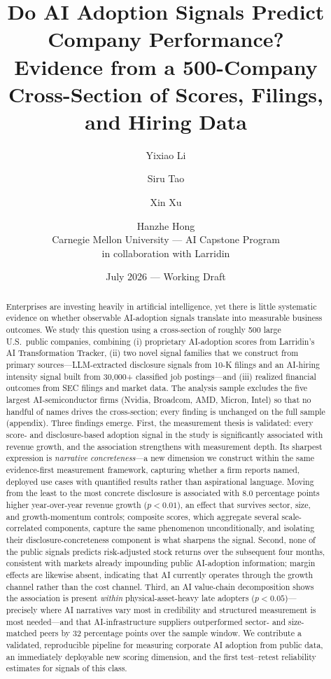 \documentclass[11pt]{article}
\title{\textbf{Do AI Adoption Signals Predict Company Performance?}\\
\large Evidence from a 500-Company Cross-Section of Scores, Filings, and Hiring Data}
\author{
Yixiao Li \and Siru Tao \and Xin Xu \and Hanzhe Hong\\[4pt]
\normalsize Carnegie Mellon University --- AI Capstone Program\\
\normalsize in collaboration with Larridin
}
\date{July 2026 --- Working Draft}
\begin{document}
\maketitle

\begin{abstract}
\noindent
Enterprises are investing heavily in artificial intelligence, yet there is little
systematic evidence on whether observable AI-adoption signals translate into
measurable business outcomes. We study this question using a cross-section of
roughly 500 large U.S.\ public companies, combining (i) proprietary AI-adoption
scores from Larridin's AI Transformation Tracker, (ii) two novel signal families
that we construct from primary sources---LLM-extracted disclosure signals from
10-K filings and an AI-hiring intensity signal built from 30{,}000+ classified
job postings---and (iii) realized financial outcomes from SEC filings and market
data. The analysis sample excludes the five largest AI-semiconductor firms
(Nvidia, Broadcom, AMD, Micron, Intel) so that no handful of names drives the
cross-section; every finding is unchanged on the full sample (appendix).
Three findings emerge. First, the measurement thesis is validated: every score- and
disclosure-based adoption signal in the study is significantly associated with
revenue growth, and the association strengthens with measurement depth. Its
sharpest expression is \emph{narrative concreteness}---a new dimension we
construct within the same evidence-first measurement framework, capturing
whether a firm reports named, deployed use cases with quantified results
rather than aspirational language. Moving from the least to the most concrete
disclosure is associated with 8.0 percentage points higher year-over-year
revenue growth ($p<0.01$), an effect that survives sector, size, and
growth-momentum controls; composite scores, which aggregate several
scale-correlated components, capture the same phenomenon unconditionally,
and isolating their disclosure-concreteness component is what sharpens the
signal. Second, none of the public signals predicts risk-adjusted stock
returns over the subsequent four months, consistent with markets already
impounding public AI-adoption information; margin effects are likewise absent,
indicating that AI currently operates through the growth channel rather than
the cost channel. Third, an AI value-chain decomposition shows the association
is present \emph{within} physical-asset-heavy late adopters
($p<0.05$)---precisely where AI narratives vary most in credibility and
structured measurement is most needed---and that AI-infrastructure suppliers
outperformed sector- and size-matched peers by 32 percentage points over the
sample window. We contribute a validated, reproducible pipeline for measuring
corporate AI adoption from public data, an immediately deployable new scoring
dimension, and the first test--retest reliability estimates for signals of
this class.
\end{abstract}
\end{document}
